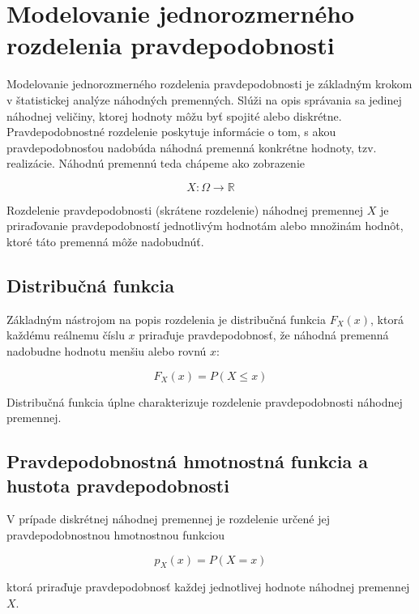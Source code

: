 \section{Modelovanie jednorozmerného rozdelenia pravdepodobnosti}\label{sec:1D_modelovanie}

Modelovanie jednorozmerného rozdelenia pravdepodobnosti je základným krokom v štatistickej analýze náhodných premenných. Slúži na opis správania sa jedinej náhodnej veličiny, ktorej hodnoty môžu byť spojité alebo diskrétne. Pravdepodobnostné rozdelenie poskytuje informácie o tom, s akou pravdepodobnosťou nadobúda náhodná premenná konkrétne hodnoty, tzv. realizácie. Náhodnú premennú teda chápeme ako zobrazenie 

\begin{equation*} 
X: \Omega \to \mathbb{R} 
\end{equation*}

Rozdelenie pravdepodobnosti (skrátene rozdelenie) náhodnej premennej $X$ je priraďovanie pravdepodobností jednotlivým hodnotám alebo množinám hodnôt, ktoré táto premenná môže nadobudnúť.

\subsection{Distribučná funkcia}

Základným nástrojom na popis rozdelenia je distribučná funkcia $F_X(x)$, ktorá každému reálnemu číslu $x$ priraďuje pravdepodobnosť, že náhodná premenná nadobudne hodnotu menšiu alebo rovnú $x$: 

\begin{equation*} 
F_X(x) = P(X \leq x) 
\end{equation*}

Distribučná funkcia úplne charakterizuje rozdelenie pravdepodobnosti náhodnej premennej. 

\subsection{Pravdepodobnostná hmotnostná funkcia a hustota pravdepodobnosti}

V prípade diskrétnej náhodnej premennej je rozdelenie určené jej pravdepodobnostnou hmotnostnou funkciou 

\begin{equation*} 
p_X(x) = P(X = x) 
\end{equation*} 

ktorá priraďuje pravdepodobnosť každej jednotlivej hodnote náhodnej premennej $X$.

